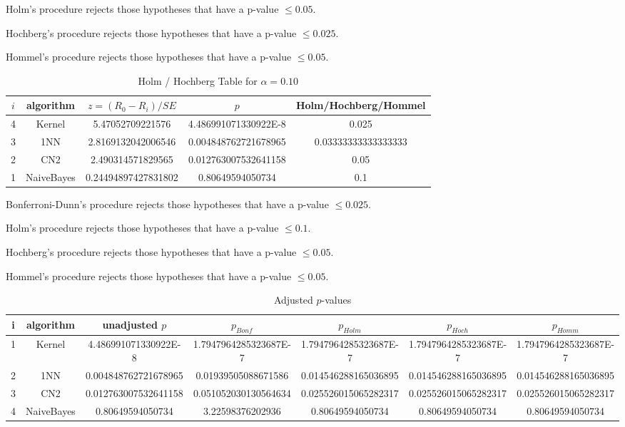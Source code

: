 \documentclass[a4paper,10pt]{article}
\begin{document}
\begin{landscape}
Holm's procedure rejects those hypotheses that have a p-value $\le0.05$.


Hochberg's procedure rejects those hypotheses that have a p-value $\le0.025$.


Hommel's procedure rejects those hypotheses that have a p-value $\le0.05$.


\begin{table}[!htp]
\centering\tiny
\caption{Holm / Hochberg Table for $\alpha=0.10$}
\begin{tabular}{ccccc}
$i$&algorithm&$z=(R_0 - R_i)/SE$&$p$&Holm/Hochberg/Hommel\\
\hline
4&Kernel&5.47052709221576&4.486991071330922E-8&0.025\\
3&1NN&2.8169132042006546&0.004848762721678965&0.03333333333333333\\
2&CN2&2.490314571829565&0.012763007532641158&0.05\\
1&NaiveBayes&0.24494897427831802&0.80649594050734&0.1\\
\hline
\end{tabular}
\end{table}
Bonferroni-Dunn's procedure rejects those hypotheses that have a p-value $\le0.025$.


Holm's procedure rejects those hypotheses that have a p-value $\le0.1$.


Hochberg's procedure rejects those hypotheses that have a p-value $\le0.05$.


Hommel's procedure rejects those hypotheses that have a p-value $\le0.05$.


\begin{table}[!htp]
\centering\tiny
\caption{Adjusted $p$-values}
\begin{tabular}{ccccccc}
i&algorithm&unadjusted $p$&$p_{Bonf}$&$p_{Holm}$&$p_{Hoch}$&$p_{Homm}$\\
\hline
1&Kernel&4.486991071330922E-8&1.7947964285323687E-7&1.7947964285323687E-7&1.7947964285323687E-7&1.7947964285323687E-7\\
2&1NN&0.004848762721678965&0.01939505088671586&0.014546288165036895&0.014546288165036895&0.014546288165036895\\
3&CN2&0.012763007532641158&0.051052030130564634&0.025526015065282317&0.025526015065282317&0.025526015065282317\\
4&NaiveBayes&0.80649594050734&3.22598376202936&0.80649594050734&0.80649594050734&0.80649594050734\\
\hline
\end{tabular}
\end{table}


\end{landscape}
\end{document}

